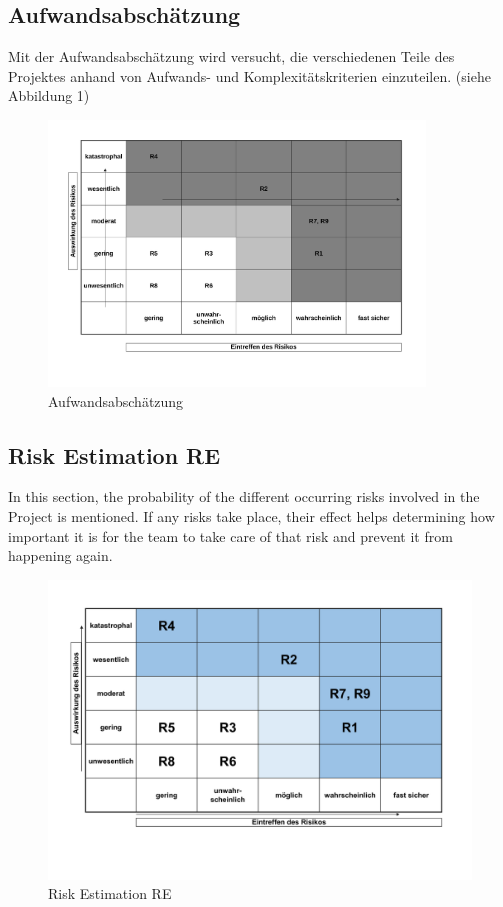 \subsection{Aufwandsabschätzung}
Mit der Aufwandsabschätzung wird versucht, die verschiedenen Teile des Projektes anhand von Aufwands- und Komplexitätskriterien einzuteilen. (siehe Abbildung 1)
\clearpage
\begin{figure}
	\begin{center}
		\includegraphics[width= 10cm]{figures/Aufwandsabschaetzung.pdf}
		\caption{Aufwandsabschätzung}
	\end{center}
\end{figure}

\subsection{Risk Estimation RE}
In this section, the probability of the different occurring risks involved in the Project is mentioned. If any risks take place, their effect helps determining how important it is for the team to take care of that risk and prevent it from happening again.

\begin{figure}
	\begin{center}
		\includegraphics[width= 17cm]{figures/Risikoabschaetzung.pdf}
		\caption{Risk Estimation RE}
	\end{center}
\end{figure}


